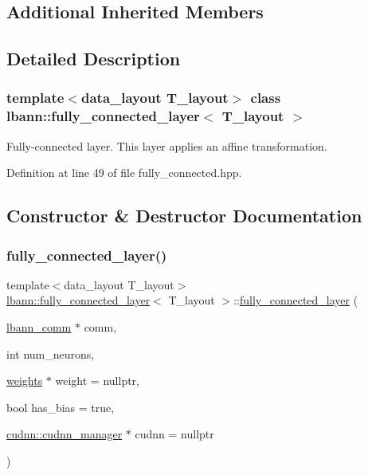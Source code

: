 \subsection*{Additional Inherited Members}


\subsection{Detailed Description}
\subsubsection*{template$<$data\+\_\+layout T\+\_\+layout$>$\newline
class lbann\+::fully\+\_\+connected\+\_\+layer$<$ T\+\_\+layout $>$}

Fully-\/connected layer. This layer applies an affine transformation. 

Definition at line 49 of file fully\+\_\+connected.\+hpp.



\subsection{Constructor \& Destructor Documentation}
\mbox{\label{classlbann_1_1fully__connected__layer_ae5d9a0f2851f3c55abe47aa65afbe66c}} 
\subsubsection{\texorpdfstring{fully\+\_\+connected\+\_\+layer()}{fully\_connected\_layer()}\hspace{0.1cm}{\footnotesize\ttfamily [1/2]}}
{\footnotesize\ttfamily template$<$data\+\_\+layout T\+\_\+layout$>$ \\
\hyperlink{classlbann_1_1fully__connected__layer}{lbann\+::fully\+\_\+connected\+\_\+layer}$<$ T\+\_\+layout $>$\+::\hyperlink{classlbann_1_1fully__connected__layer}{fully\+\_\+connected\+\_\+layer} (\begin{DoxyParamCaption}\item[{\hyperlink{classlbann_1_1lbann__comm}{lbann\+\_\+comm} $\ast$}]{comm,  }\item[{int}]{num\+\_\+neurons,  }\item[{\hyperlink{classlbann_1_1weights}{weights} $\ast$}]{weight = {\ttfamily nullptr},  }\item[{bool}]{has\+\_\+bias = {\ttfamily true},  }\item[{\hyperlink{classlbann_1_1cudnn_1_1cudnn__manager}{cudnn\+::cudnn\+\_\+manager} $\ast$}]{cudnn = {\ttfamily nullptr} }\end{DoxyParamCaption})\hspace{0.3cm}{\ttfamily [inline]}}



